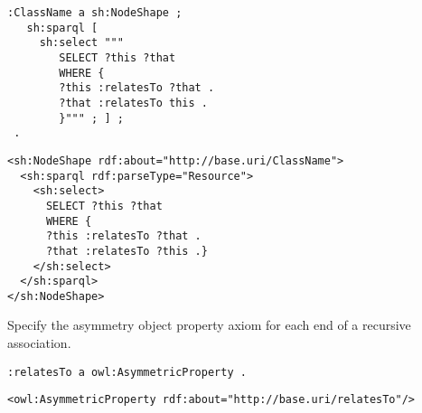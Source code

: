 \vspace{-\parskip}
\begin{minipage}[b]{.385\textwidth}
\begin{lstlisting}[language=Turtle, caption={Declaring an asymmetric property in Turtle syntax}, captionpos=b]
 :ClassName a sh:NodeShape ;
   sh:sparql [
     sh:select """
        SELECT ?this ?that
        WHERE {
        ?this :relatesTo ?that .
        ?that :relatesTo this .
        }""" ; ] ;
 .
\end{lstlisting}
\end{minipage}%
\quad\vspace{-\parskip}
\begin{minipage}[b]{.55\textwidth}
\begin{lstlisting}[language=RDF/XML, caption={Declaring an asymmetric property in RDF/XML syntax}, captionpos=b]
<sh:NodeShape rdf:about="http://base.uri/ClassName">
  <sh:sparql rdf:parseType="Resource">
    <sh:select>
      SELECT ?this ?that
      WHERE {
      ?this :relatesTo ?that .
      ?that :relatesTo ?this .}
    </sh:select>
  </sh:sparql>
</sh:NodeShape>
\end{lstlisting}
\end{minipage}
\vspace{-\parskip}

\begin{trule}
	\label{rule:association-uni-asymetry-rc}
	Specify the asymmetry object property axiom for each end of a recursive association.
\end{trule}

\vspace{-\parskip}
\begin{minipage}[b]{.45\textwidth}
\begin{lstlisting}[language=Turtle, caption={Declaring an asymmetric property in Turtle syntax}, captionpos=b]
:relatesTo a owl:AsymmetricProperty .
\end{lstlisting}
\end{minipage}%
\quad\vspace{-\parskip}
\begin{minipage}[b]{.55\textwidth}
\begin{lstlisting}[language=RDF/XML, caption={Declaring an asymmetric property in RDF/XML syntax}, captionpos=b]
<owl:AsymmetricProperty rdf:about="http://base.uri/relatesTo"/>
\end{lstlisting}
\end{minipage}
\vspace{-\parskip}


